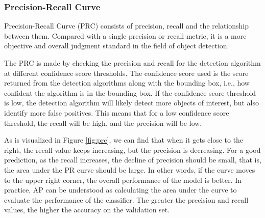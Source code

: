 \documentclass[journal,article,submit,moreauthors,pdftex]{Definitions/mdpi}
\begin{document}
\subsubsection{Precision-Recall Curve}
Precision-Recall Curve (PRC) consists of precision, recall and the relationship between them. Compared with a single precision or recall metric, it is a more objective and overall judgment standard in the field of object detection. 

The PRC is made by checking the precision and recall for the detection algorithm at different confidence score thresholds. The confidence score used is the score returned from the detection algorithms along with the bounding box, i.e., how confident the algorithm is in the bounding box. If the confidence score threshold is low, the detection algorithm will likely detect more objects of interest, but also identify more false positives. This means that for a low confidence score threshold, the recall will be high, and the precision will be low.

As is visualized in Figure \ref{fig:prc}, we can find that when it gets close to the right, the recall value keeps increasing, but the precision is decreasing. For a good prediction, as the recall increases, the decline of precision should be small, that is, the area under the PR curve should be large. In other words, if the curve moves to the upper right corner, the overall performance of the model is better. In practice, AP can be understood as calculating the area under the curve to evaluate the performance of the classifier. The greater the precision and recall values, the higher the accuracy on the validation set.
\end{document}
